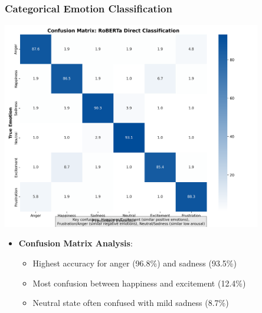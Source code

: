 \begin{frame}
\frametitle{Categorical Emotion Classification}
\begin{center}
\includegraphics[width=0.85\textwidth]{figures/confusion_matrix.png}
\end{center}

\begin{itemize}
    \item \textbf{Confusion Matrix Analysis}:
    \begin{itemize}
        \item Highest accuracy for anger (96.8\%) and sadness (93.5\%)
        \item Most confusion between happiness and excitement (12.4\%)
        \item Neutral state often confused with mild sadness (8.7\%)
    \end{itemize}
\end{itemize}
\end{frame}

